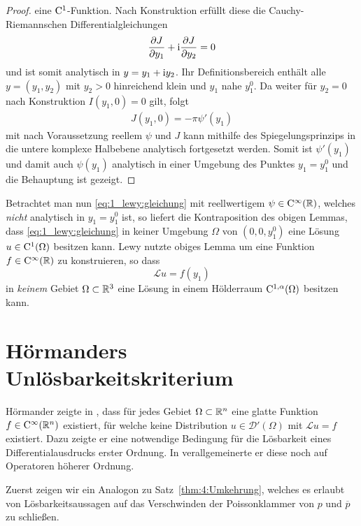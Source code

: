 \begin{proof}
eine $\mathrm C^1$-Funktion. Nach Konstruktion erfüllt diese die Cauchy-Riemannschen Differentialgleichungen
\begin{equation}
\frac{\partial J}{\partial y_1} +\mathrm i\frac{\partial J}{\partial y_2} = 0
\end{equation}
 und ist somit analytisch in $y=y_1+\mathrm i y_2$. Ihr Definitionsbereich enthält alle $y=(y_1,y_2)$ mit $y_2>0$ hinreichend klein und $y_1$ nahe $y_1^0$.
 Da weiter für $y_2=0$ nach Konstruktion $I(y_1,0)=0$ gilt, folgt
\begin{align*}
 J(y_1,0)=-\pi\psi'(y_1)
\end{align*}
mit nach Voraussetzung reellem $\psi$ und $J$ kann mithilfe des Spiegelungsprinzips in die untere komplexe Halbebene analytisch fortgesetzt werden. Somit ist $\psi'(y_1)$ 
und damit auch $\psi(y_1)$ analytisch in einer Umgebung des Punktes $y_1=y_1^0$ und die Behauptung ist gezeigt.
\end{proof}

Betrachtet man nun \eqref{eq:1_lewy:gleichung} mit reellwertigem $\psi\in \mathrm C^\infty(\mathbb R)$, welches \textit{nicht} analytisch in $y_1=y_1^0$ ist, so liefert die Kontraposition des obigen Lemmas, dass \eqref{eq:1_lewy:gleichung} in keiner Umgebung $\Omega$ von $(0,0,y_1^0)$ eine Lösung $u\in \mathrm C^1(\Omega)$ besitzen kann. Lewy nutzte obiges Lemma um eine Funktion $f\in\mathrm C^\infty(\mathbb R)$ zu konstruieren, so dass
\begin{equation} 
   \mathscr L u = f(y_1)
\end{equation}
in {\em keinem} Gebiet $\Omega\subset\mathbb R^3$ eine Lösung in einem Hölderraum $\mathrm C^{1,\alpha}(\Omega)$ besitzen kann.




\section{Hörmanders Unlösbarkeitskriterium}
Hörmander zeigte in \cite{Hormander:1960a}, dass für jedes Gebiet $\Omega\subset\mathbb R^n$ eine glatte Funktion $f\in\mathrm C^\infty(\mathbb R^n)$ existiert, für welche keine Distribution $u\in\mathscr{D}'(\Omega)$ mit $\mathscr Lu=f$ existiert. Dazu zeigte er eine notwendige Bedingung für die Lösbarkeit eines Differentialausdrucks erster Ordnung. In \cite{Hormander:1960b} verallgemeinerte er diese noch auf Operatoren höherer Ordnung.

Zuerst zeigen wir ein Analogon zu Satz~\ref{thm:4:Umkehrung}, welches es erlaubt von Lösbarkeitsaussagen auf das Verschwinden der Poissonklammer 
von $p$ und $\overline p$ zu schließen. 

